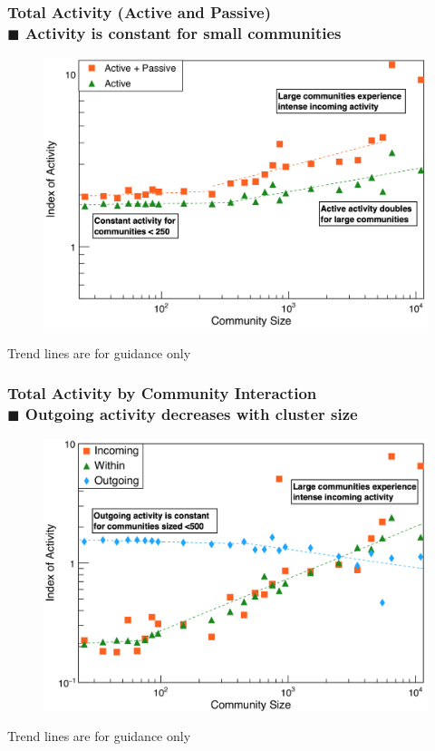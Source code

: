 \documentclass{beamer}
\begin{document}
\begin{frame}
\frametitle{Total Activity (Active and Passive) \\ \normalsize $\blacksquare$ Activity is constant for small communities }
\begin{figure}
	\vspace*{-0.1cm}
	\includegraphics[width=0.8\linewidth]{figures/activity/total}
\end{figure}
\small Trend lines are for guidance only

\end{frame}


\begin{frame}
\frametitle{Total Activity by Community Interaction \\ \normalsize $\blacksquare$ Outgoing activity decreases with cluster size}

\begin{figure}
	\vspace*{-0.1cm}
	\includegraphics[width=0.79\linewidth]{figures/activity/total_by_type}
\end{figure}
\small Trend lines are for guidance only

\end{frame}
\end{document}
